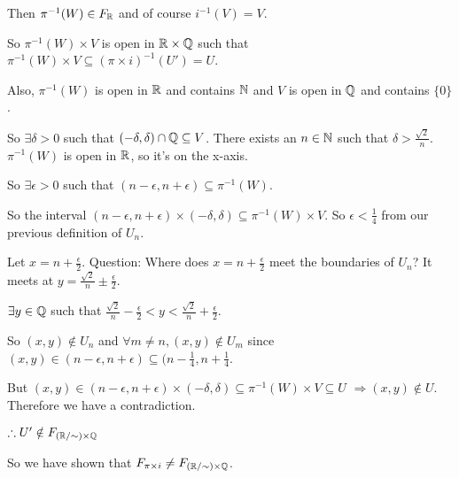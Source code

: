 Then $\pi^{-1}(W) \in F_{\mathbb R}$ and of course $i^{-1}(V) = V$.

So $\pi^{-1}(W) \times V$ is open in $\mathbb R\times \mathbb Q$ such that $\pi^{-1}(W) \times V \subseteq (\pi \times i)^{-1}(U') = U$.

Also, $\pi^{-1}(W)$ is open in $\mathbb R$ and contains $\mathbb N$ and $V$ is open in $\mathbb Q$ and contains $\{0\}$.

So $\exists \delta >0$ such that $(-\delta, \delta) \cap \mathbb Q \subseteq V$. There exists an $n\in \mathbb N$ such that $\delta > \frac{\sqrt{2}}{n}$. $\pi^{-1}(W)$ is open in $\mathbb R$, so it's on the x-axis.

So $\exists \epsilon >0$ such that $(n-\epsilon, n+\epsilon)\subseteq \pi^{-1}(W)$.

So the interval $(n-\epsilon, n+\epsilon)\times (-\delta, \delta)\subseteq \pi^{-1}(W)\times V$. So $\epsilon < \frac{1}{4}$ from our previous definition of $U_n$.

Let $x = n + \frac{\epsilon}{2}$. Question: Where does $x = n + \frac{\epsilon}{2}$ meet the boundaries of $U_n$? It meets at $y = \frac{\sqrt{2}}{n} \pm \frac{\epsilon}{2}$.

$\exists y \in \mathbb Q$ such that $\frac{\sqrt{2}}{n} - \frac{\epsilon}{2} < y < \frac{\sqrt{2}}{n} + \frac{\epsilon}{2}$.

So $(x,y) \notin U_n$ and $\forall m\neq n, (x,y)\notin U_m$ since $(x,y) \in (n-\epsilon, n+\epsilon)\subseteq (n-\frac{1}{4}, n+\frac{1}{4}$.

But $(x,y) \in (n-\epsilon, n+\epsilon) \times (-\delta, \delta) \subseteq \pi^{-1}(W) \times V \subseteq U$ $\Rightarrow (x,y) \notin U$. Therefore we have a contradiction.

$\therefore U' \notin F_{(\mathbb R/\sim)\times \mathbb Q}$

So we have shown that $F_{\pi\times i} \neq F_{(\mathbb R/\sim) \times \mathbb Q}$.

